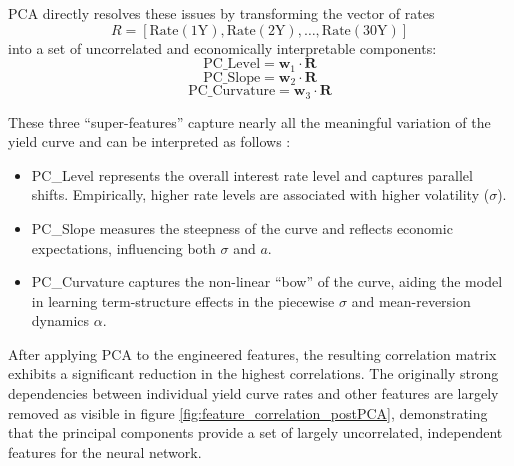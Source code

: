 {PCA directly resolves these issues by transforming the vector of rates
\[
	R = [\text{Rate}(1\text{Y}), \text{Rate}(2\text{Y}), \dots, \text{Rate}(30\text{Y})]
\]
into a set of uncorrelated and economically interpretable components:
\begin{equation}
	\text{PC\_Level} = \mathbf{w}_1 \cdot \mathbf{R}
\end{equation}
\begin{equation}
	\text{PC\_Slope} = \mathbf{w}_2 \cdot \mathbf{R}
\end{equation}
\begin{equation}
	\text{PC\_Curvature} = \mathbf{w}_3 \cdot \mathbf{R}
\end{equation}

These three “super-features” capture nearly all the meaningful variation of the yield curve and can be interpreted as follows \parencite[pp.~98--107]{Rebonato_2018}:
\begin{itemize}
	\item PC\_Level represents the overall interest rate level and captures parallel shifts. Empirically, higher rate levels are associated with higher volatility (\(\sigma\)).
	\item PC\_Slope measures the steepness of the curve and reflects economic expectations, influencing both \(\sigma\) and \(a\).
	\item PC\_Curvature captures the non-linear “bow” of the curve, aiding the model in learning term-structure effects in the piecewise $\sigma$ and mean-reversion dynamics $\alpha$.
\end{itemize}

After applying PCA to the engineered features, the resulting correlation matrix exhibits a significant reduction in the highest correlations. The originally strong dependencies between individual yield curve rates and other features are largely removed as visible in figure \ref{fig:feature_correlation_postPCA}, demonstrating that the principal components provide a set of largely uncorrelated, independent features for the neural network.

}

